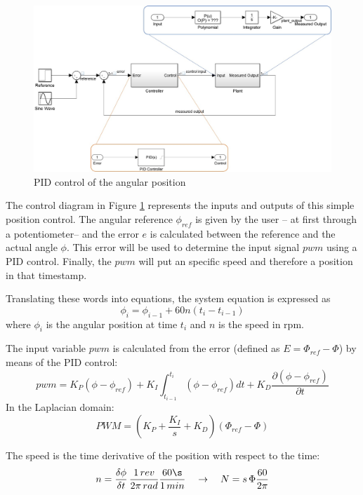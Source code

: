 \newpage
\begin{figure}[h!]
	\includegraphics[width=1\linewidth]{figs/05/own/model_own_1}
	\caption{PID control of the angular position}
	\label{model_own_1}
\end{figure}

The control diagram in Figure \ref{model_own_1} represents the inputs and outputs of this simple position control. The angular reference $\phi_{ref}$ is given by the user -- at first through a potentiometer-- and the error $e$ is calculated between the reference and the actual angle $\phi$. This error will be used to determine the input signal $pwm$ using a PID control. Finally, the $pwm$ will put an specific speed and therefore a position in that timestamp.
 
Translating these words into equations, the system equation is expressed as \[\phi_{i}=\phi_{i-1}+60n(t_{i}-t_{i-1})\] where $\phi_{i}$ is the angular position at time $t_{i}$ and $n$ is the speed in rpm.

The input variable $pwm$ is calculated from the error (defined as $E=\Phi_{ref}-\Phi$) by means of the PID control: 
\[pwm=K_{P}(\phi-\phi_{ref})+K_{I}\int_{t_{i-1}}^{t_{i}}(\phi-\phi_{ref}) dt + K_{D}\frac{\partial (\phi-\phi_{ref})}{\partial t}\] In the Laplacian domain: \[PWM=(K_{P}+\frac{K_{I}}{s}+K_{D})(\Phi_{ref}-\Phi)\]

The speed is the time derivative of the position with respect to the time:
\[n =\frac{\delta\phi}{\delta t}\,\frac{1\,rev}{2\pi\,rad}\frac{60\s}{1\,min}\quad\rightarrow\quad N=s\,\Phi \frac{60}{2\pi}\]

